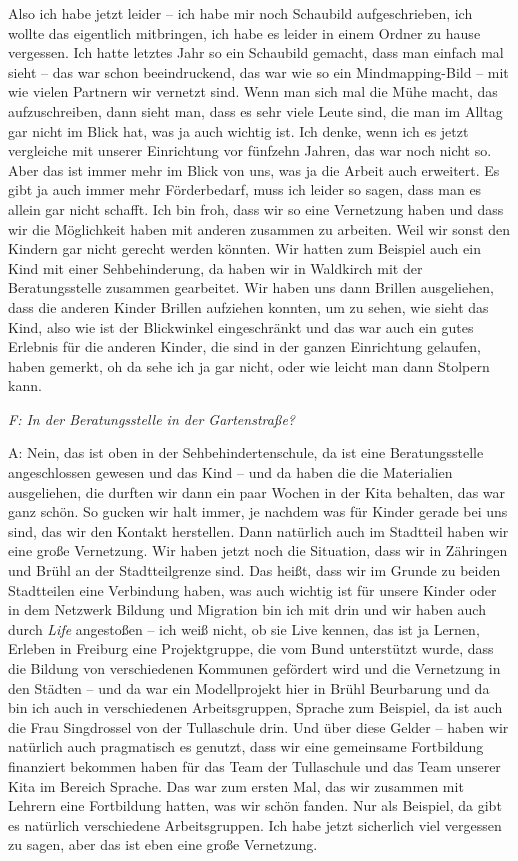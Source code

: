 Also ich habe jetzt leider -- ich habe mir noch Schaubild aufgeschrieben, ich wollte das eigentlich mitbringen, ich habe es leider in einem Ordner zu hause vergessen. Ich hatte letztes Jahr so ein Schaubild gemacht, dass man einfach mal sieht -- das war schon beeindruckend, das war wie so ein Mindmapping-Bild -- mit wie vielen Partnern wir vernetzt sind. Wenn man sich mal die Mühe macht, das aufzuschreiben, dann sieht man, dass es sehr viele Leute sind, die man im Alltag gar nicht im Blick hat, was ja auch wichtig ist. Ich denke, wenn ich es jetzt vergleiche mit unserer Einrichtung vor fünfzehn Jahren, das war noch nicht so. Aber das ist immer mehr im Blick von uns, was ja die Arbeit auch erweitert. Es gibt ja auch immer mehr Förderbedarf, muss ich leider so sagen, dass man es allein gar nicht schafft. Ich bin froh, dass wir so eine Vernetzung haben und dass wir die Möglichkeit haben mit anderen zusammen zu arbeiten. Weil wir sonst den Kindern gar nicht gerecht werden könnten. Wir hatten zum Beispiel auch ein Kind mit einer Sehbehinderung, da haben wir in Waldkirch mit der Beratungsstelle zusammen gearbeitet. Wir haben uns dann Brillen ausgeliehen, dass die anderen Kinder Brillen aufziehen konnten, um zu sehen, wie sieht das Kind, also wie ist der Blickwinkel eingeschränkt und das war auch ein gutes Erlebnis für die anderen Kinder, die sind in der ganzen Einrichtung gelaufen, haben gemerkt, oh da sehe ich ja gar nicht, oder wie leicht man dann Stolpern kann. 

\emph{F: In der Beratungsstelle in der Gartenstraße?}

A: Nein, das ist oben in der Sehbehindertenschule, da ist eine Beratungsstelle angeschlossen gewesen und das Kind -- und da haben die die Materialien ausgeliehen, die durften wir dann ein paar Wochen in der Kita behalten, das war ganz schön. So gucken wir halt immer, je nachdem was für Kinder gerade bei uns sind, das wir den Kontakt herstellen. Dann natürlich auch im Stadtteil haben wir eine große Vernetzung. Wir haben jetzt noch die Situation, dass wir in Zähringen und Brühl an der Stadtteilgrenze sind. Das heißt, dass wir im Grunde zu beiden Stadtteilen eine Verbindung haben, was auch wichtig ist für unsere Kinder oder in dem Netzwerk Bildung und Migration bin ich mit drin und wir haben auch durch \emph{Life} angestoßen -- ich weiß nicht, ob sie Live kennen, das ist ja Lernen, Erleben in Freiburg eine Projektgruppe, die vom Bund unterstützt wurde, dass die Bildung von verschiedenen Kommunen gefördert wird und die Vernetzung in den Städten  -- und da war ein Modellprojekt hier in Brühl Beurbarung und da bin ich auch in verschiedenen Arbeitsgruppen, Sprache zum Beispiel, da ist auch die Frau Singdrossel von der Tullaschule drin. Und über diese Gelder -- haben wir natürlich auch pragmatisch es genutzt, dass wir eine gemeinsame Fortbildung finanziert bekommen haben für das Team der Tullaschule und das Team unserer Kita im Bereich Sprache. Das war zum ersten Mal, das wir zusammen mit Lehrern eine Fortbildung hatten, was wir schön fanden. Nur als Beispiel, da gibt es natürlich verschiedene Arbeitsgruppen. Ich habe jetzt sicherlich viel vergessen zu sagen, aber das ist eben eine große Vernetzung. 

